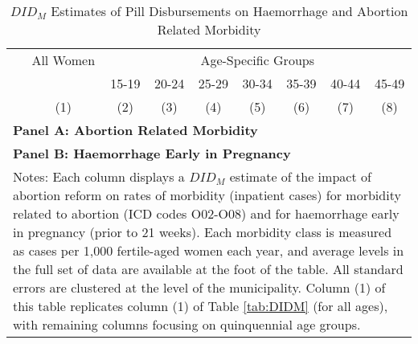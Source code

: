 \documentclass[12pt]{article}
\begin{document}
\begin{landscape}
  \begin{table}[htpb!]
    \centering
    \caption{$DID_M$ Estimates of Pill Disbursements on Haemorrhage and Abortion Related Morbidity}
    \label{tab:DD}
    \begin{tabular}{lcccccccc}\toprule
      &All Women&\multicolumn{7}{c}{Age-Specific Groups} \\ \cmidrule(r){3-9}
      &&15-19&20-24&25-29&30-34&35-39&40-44&45-49 \\
      &(1)&(2)&(3)&(4)&(5)&(6)&(7)&(8) \\ \midrule
      \multicolumn{9}{l}{\textbf{Panel A: Abortion Related Morbidity}} \\
      
      \multicolumn{9}{l}{\textbf{Panel B: Haemorrhage Early in Pregnancy}} \\
       
      \bottomrule
      \multicolumn{9}{p{19.2cm}}{{\footnotesize Notes: Each column displays a $DID_M$ estimate of the impact of abortion reform on rates of morbidity (inpatient cases) for morbidity related to abortion (ICD codes O02-O08) and for haemorrhage early in pregnancy (prior to 21 weeks).  Each morbidity class is measured as cases per 1,000 fertile-aged women each year, and average levels in the full set of data are available at the foot of the table.  All standard errors are clustered at the level of the municipality.  Column (1) of this table replicates column (1) of Table \ref{tab:DIDM} (for all ages), with remaining columns focusing on quinquennial age groups.}}
    \end{tabular}
  \end{table}
\end{landscape}
\end{document}
